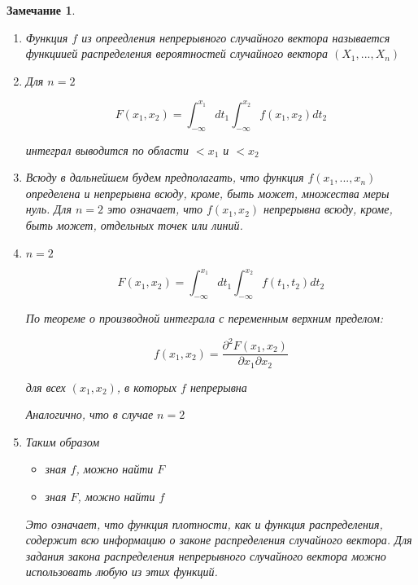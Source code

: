 \documentclass[a4paper, 14pt]{report}
\newtheorem{note}{Замечание}[section]
\begin{document}
\begin{note}
    \begin{enumerate}
        \item Функция $f$ из опреедления непрерывного случайного вектора называется функциией распределения вероятностей случайного вектора $(X_1, ..., X_n)$
        \item Для $n = 2$

            $$
            F(x_1, x_2) = \int_{-\infty}^{x_1} dt_1\int_{-\infty}^{x_2} f(x_1, x_2)dt_2
            $$

            интеграл выводится по области $<x_1$ и $<x_2$

        \item Всюду в дальнейшем будем предполагать, что функция $f(x_1,...,x_n)$ определена и непрерывна всюду, кроме, быть может, множества меры нуль. Для $n=2$ это означает, что $f(x_1, x_2)$ непрерывна всюду, кроме, быть может, отдельных точек или линий.

        \item $n=2$

            $$
            F(x_1, x_2) = \int_{-\infty}^{x_1} dt_1 \int_{-\infty}^{x_2} f(t_1, t_2) dt_2
            $$

            По теореме о производной интеграла с переменным верхним пределом:

            $$
            f(x_1, x_2) = \frac{\partial^2 F(x_1,x_2)}{\partial x_1 \partial x_2}
            $$

            для всех $(x_1, x_2)$, в которых $f$ непрерывна

            Аналогично, что в случае $n=2$

        \item Таким образом

            \begin{itemize}
                \item зная $f$, можно найти $F$
                \item зная $F$, можно найти $f$
            \end{itemize}

            Это означает, что функция плотности, как и функция распределения, содержит всю информацию о законе распределения случайного вектора. Для задания закона распределения непрерывного случайного вектора можно использовать любую из этих функций.
    \end{enumerate}
\end{note}
\end{document}
